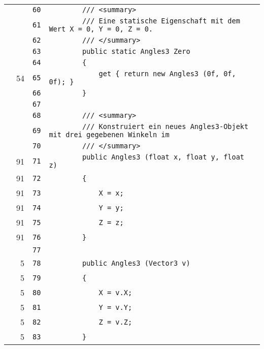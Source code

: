 \documentclass[a4paper,10pt]{article}
\begin{document}
\begin{longtable}[l]{lrrl}
\cellcolor{gray} &  & \verb~60~ & \verb~        /// <summary>~\\
\cellcolor{gray} &  & \verb~61~ & \verb~        /// Eine statische Eigenschaft mit dem Wert X = 0, Y = 0, Z = 0.~\\
\cellcolor{gray} &  & \verb~62~ & \verb~        /// </summary>~\\
\cellcolor{gray} &  & \verb~63~ & \verb~        public static Angles3 Zero~\\
\cellcolor{gray} &  & \verb~64~ & \verb~        {~\\
\cellcolor{green} & 54 & \verb~65~ & \verb~            get { return new Angles3 (0f, 0f, 0f); }~\\
\cellcolor{gray} &  & \verb~66~ & \verb~        }~\\
\cellcolor{gray} &  & \verb~67~ & \verb~~\\
\cellcolor{gray} &  & \verb~68~ & \verb~        /// <summary>~\\
\cellcolor{gray} &  & \verb~69~ & \verb~        /// Konstruiert ein neues Angles3-Objekt mit drei gegebenen Winkeln im~\\
\cellcolor{gray} &  & \verb~70~ & \verb~        /// </summary>~\\
\cellcolor{green} & 91 & \verb~71~ & \verb~        public Angles3 (float x, float y, float z)~\\
\cellcolor{green} & 91 & \verb~72~ & \verb~        {~\\
\cellcolor{green} & 91 & \verb~73~ & \verb~            X = x;~\\
\cellcolor{green} & 91 & \verb~74~ & \verb~            Y = y;~\\
\cellcolor{green} & 91 & \verb~75~ & \verb~            Z = z;~\\
\cellcolor{green} & 91 & \verb~76~ & \verb~        }~\\
\cellcolor{gray} &  & \verb~77~ & \verb~~\\
\cellcolor{green} & 5 & \verb~78~ & \verb~        public Angles3 (Vector3 v)~\\
\cellcolor{green} & 5 & \verb~79~ & \verb~        {~\\
\cellcolor{green} & 5 & \verb~80~ & \verb~            X = v.X;~\\
\cellcolor{green} & 5 & \verb~81~ & \verb~            Y = v.Y;~\\
\cellcolor{green} & 5 & \verb~82~ & \verb~            Z = v.Z;~\\
\cellcolor{green} & 5 & \verb~83~ & \verb~        }~\\

\end{longtable}
\end{document}
